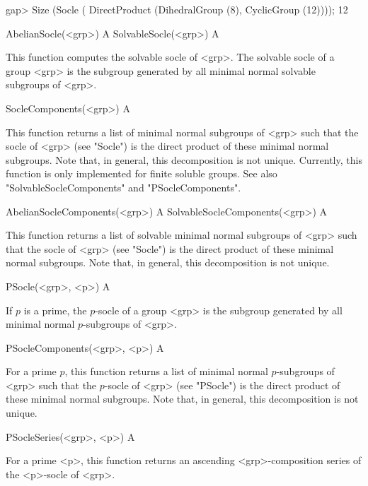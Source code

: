 \beginexample
gap> Size (Socle ( DirectProduct (DihedralGroup (8), CyclicGroup (12))));
12
\endexample

\>AbelianSocle(<grp>) A
\>SolvableSocle(<grp>) A

This function computes the solvable socle of <grp>. The solvable socle of a group <grp> is the
subgroup  generated by all minimal normal solvable subgroups of <grp>.

\>SocleComponents(<grp>) A

This function returns a list of minimal normal subgroups of <grp> such 
that the socle of <grp> (see "Socle") is the direct product of these minimal normal
subgroups. Note that, in general, this decomposition is not unique. Currently,
this function is only implemented for finite soluble groups. See also 
"SolvableSocleComponents" and  "PSocleComponents".

\>AbelianSocleComponents(<grp>) A
\>SolvableSocleComponents(<grp>) A

This function returns a list of solvable minimal normal subgroups of <grp> such 
that the socle of <grp> (see "Socle") is the direct product of these minimal normal
subgroups. Note that, in general, this decomposition is not unique.

\>PSocle(<grp>, <p>) A

If $p$ is a prime, the $p$-socle of a group <grp> is the subgroup 
generated by all minimal normal $p$-subgroups of <grp>.

\>PSocleComponents(<grp>, <p>) A

For a prime $p$, this function returns a list of minimal normal $p$-subgroups of <grp>
such  that the $p$-socle of <grp> (see "PSocle") is the direct product of these minimal normal
subgroups. Note that, in general, this decomposition is not unique.

\>PSocleSeries(<grp>, <p>) A

For a prime <p>, this function returns an ascending <grp>-composition series of the <p>-socle of <grp>.



